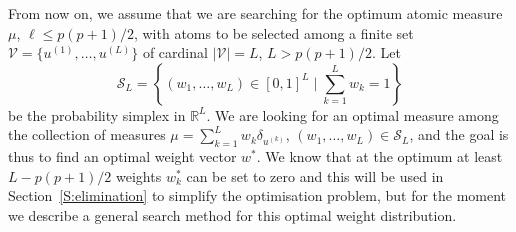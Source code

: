 \documentclass[twocolumn]{autart}
\newcommand{\LP}[1]{{\textcolor{purple}{[LP: \textit{#1}]}}}
\newcommand{\Luc}{\color{magenta} }
\theoremstyle{definition}
\theoremstyle{remark}
\newtheorem{remark}[theorem]{Remark}
\newcommand{\R}{\mathbb{R}}
\newcommand{\V}{\mathcal{V}}
\newcommand{\Mb}{\mathbf{M}}
\renewcommand{\S}{\mathcal{S}}
\begin{document}




From now on, we assume that we are searching for the optimum atomic measure $\mu$, $\ell\leq p(p+1)/2$, with atoms to be selected among a finite set  $\V=\{u^{(1)}, \dots ,u^{(L)}\}$ of cardinal $|\V|=L$, $L>p(p+1)/2$.
Let
$$
\S_L=\left\{
(w_1,\dots, w_L)\in [0,1]^L
\mid 
\sum_{k=1}^L w_k=1 
\right\}
$$ 
be the 
probability
simplex in $\R^L$. %
We are looking for an optimal measure among the collection of measures $\mu=\sum_{k=1}^L w_k\delta_{u^{(k)}}$, $(w_1,\dots, w_L)\in \S_L$, and the goal is thus to find an optimal weight vector $w^*$.
{\Luc We know that at the optimum at least $L-p(p+1)/2$ weights $w_k^*$ can be set to zero and this will be used in Section~\ref{S:elimination} to simplify the optimisation problem, but for the moment we describe a general search method for this optimal weight distribution}.
\end{document}
